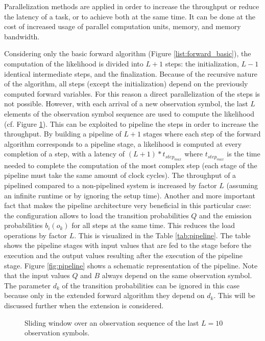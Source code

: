 \documentclass[mscthesis]{usiinfthesis}
\begin{document}
Parallelization methods are applied in order to increase the throughput or
reduce the latency of a task, or to achieve both at the same time. It can be
done at the cost of increased usage of parallel computation units, memory, and
memory bandwidth.

Considering only the basic forward algorithm (Figure
\ref{list:forward_basic}), the computation of the likelihood is divided into
$L+1$ steps: the initialization, $L-1$ identical intermediate steps, and the
finalization. Because of the recursive nature of the algorithm, all steps
(except the initialization) depend on the previously computed forward
variables. For this reason a direct parallelization of the steps is not
possible. However, with each arrival of a new observation symbol, the last $L$
elements of the observation symbol sequence are used to compute the likelihood
(cf. Figure \ref{fig:sliding}). This can be exploited to pipeline the steps in
order to increase the throughput. By building a pipeline of $L+1$ stages where
each step of the forward algorithm corresponds to a pipeline stage,
a likelihood is computed at every completion of a step, with a latency of
$(L+1)*t_{step_{max}}$ where $t_{step_{max}}$ is the time needed to complete
the computation of the most complex step (each stage of the pipeline must take
the same amount of clock cycles). The throughput of a pipelined compared to
a non-pipelined system is increased by factor $L$ (assuming an infinite runtime
or by ignoring the setup time). Another and more important fact that makes the
pipeline architecture very beneficial in this particular case: the
configuration allows to load the transition probabilities $Q$ and the emission
probabilities $b_i(o_k)$ for all steps at the same time. This reduces the load
operations by factor $L$. This is visualized in the Table \ref{tab:pipeline}.
The table shows the pipeline stages with input values that are fed to the stage
before the execution and the output values resulting after the execution of
the pipeline stage. Figure \ref{fig:pipeline} shows a schematic representation
of the pipeline. Note that the input values $Q$ and $B$ always depend on
the same observation symbol. The parameter $d_k$ of the transition
probabilities can be ignored in this case because only in the extended forward
algorithm they depend on $d_k$. This will be discussed further when the
extension is considered.

\begin{figure}
    \centering
    
    \caption{Sliding window over an observation sequence of the
        last $L=10$ observation symbols.}
    \label{fig:sliding}
\end{figure}
\end{document}
